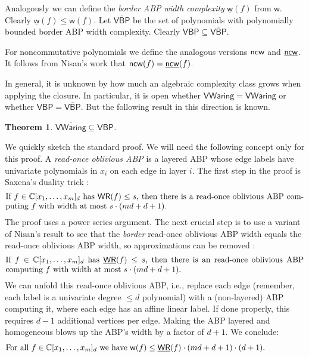 \documentclass[10pt,a4paper]{article}
\numberwithin{equation}{section}
\newtheorem{theorem}[equation]{Theorem}
\theoremstyle{definition}
\newcommand{\IC}{\mathbb{C}}
\newcommand{\ncw}{\textup{\textsf{ncw}}}
\newcommand{\VBP}{\ensuremath{\mathsf{VBP}}}
\newcommand{\VWaring}{\ensuremath{\mathsf{VWaring}}}
\newcommand{\WR}{{\mathsf{WR}}}
\newcommand{\wW}{{\mathsf{w}}}
\newcommand{\WRbar}{\underline{\mathsf{WR}}}
\begin{document}
Analogously we can define the \emph{border ABP width complexity} $\underline{\wW}(f)$ from $\wW$. Clearly $\underline{\wW}(f)\leq \wW(f)$.
Let $\overline{\VBP}$ be the set of polynomials with polynomially bounded border ABP width complexity. Clearly $\VBP \subseteq \overline{\VBP}$.

For noncommutative polynomials we define the analogous versions $\ncw$ and $\underline{\ncw}$. It follows from Nisan's work \cite{nisan1991lower} that $\ncw(f)=\underline{\ncw}(f)$.

In general, it is unknown by how much an algebraic complexity class grows when applying the closure. In particular, it is open whether $\VWaring = \overline{\VWaring}$ or whether $\VBP = \overline{\VBP}$.
But the following result in this direction is known.

\begin{theorem}\label{thm:borderwaringinVBP}
$\overline{\VWaring} \subseteq \VBP$.
\end{theorem}
We quickly sketch the standard proof.
We will need the following concept only for this proof.
A \emph{read-once oblivious ABP} is a layered ABP whose edge labels have univariate polynomials in $x_i$ on each edge in layer $i$.
The first step in the proof is Saxena's duality trick \cite[Lemma~1]{Sax:08}:
\begin{equation*}
\begin{minipage}{13cm}
If $f \in \IC[x_1,\ldots,x_m]_d$ has $\WR(f)\leq s$, then there is a read-once oblivious ABP computing $f$ with width at most $s\cdot(md+d+1)$.
\end{minipage}
\end{equation*}
The proof uses a power series argument.
The next crucial step is to use a variant of Nisan's result \cite{nisan1991lower} to see that the \emph{border} read-once oblivious ABP width equals the read-once oblivious ABP width, so approximations can be removed \cite[Sec.~4.5.2]{For:14}:
\begin{equation*}
\begin{minipage}{13cm}
If $f \in \IC[x_1,\ldots,x_m]_d$ has $\WRbar(f)\leq s$, then there is an read-once oblivious ABP computing $f$ with width at most $s\cdot(md+d+1)$.
\end{minipage}
\end{equation*}
We can unfold this read-once oblivious ABP, i.e., replace each edge (remember, each label is a univariate degree $\leq d$ polynomial) with a (non-layered) ABP computing it, where each edge has an affine linear label. If done properly, this requires $d-1$ additional vertices per edge.
Making the ABP layered and homogeneous blows up the ABP's width by a factor of $d+1$.
We conclude:
\begin{equation}\label{thm:theirsaxenaduality}
\begin{minipage}{13cm}
For all $f \in \IC[x_1,\ldots,x_m]_d$ we have $\wW(f) \leq \WRbar(f)\cdot(md+d+1)\cdot(d+1)$.
\end{minipage}
\end{equation}
\end{document}
